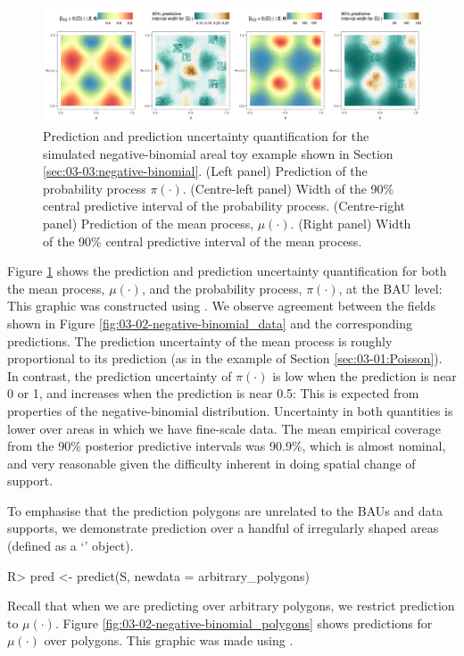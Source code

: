 \documentclass[article]{jss}
\newcommand{\class}[1]{`\code{#1}'}
\newcommand{\fct}[1]{\code{#1()}}
\begin{document}
\begin{figure}[t!]
    \centering
    \includegraphics[width = \linewidth]{img/Negbinom_sim_BAU_predictions.png}
    \caption{Prediction and prediction uncertainty quantification for the simulated negative-binomial areal toy example shown in Section \ref{sec:03-03:negative-binomial}. (Left panel) Prediction of the probability process $\pi(\cdot)$. (Centre-left panel) Width of the 90\% central predictive interval of the probability process. (Centre-right panel) Prediction of the mean process, $\mu(\cdot)$. (Right panel) Width of the 90\% central predictive interval of the mean process.
}   
  \label{fig:03-02-negative-binomial}
\end{figure}

Figure \ref{fig:03-02-negative-binomial} shows the prediction and prediction uncertainty quantification for both the mean process, $\mu(\cdot)$, and the probability process, $\pi(\cdot)$, at the BAU level: This graphic was constructed using \fct{plot}.
We observe agreement between the fields shown in Figure \ref{fig:03-02-negative-binomial_data} and the corresponding predictions.  
The prediction uncertainty of the mean process is roughly proportional to its prediction (as in the example of Section \ref{sec:03-01:Poisson}). 
In contrast, the prediction uncertainty of $\pi(\cdot)$ is low when the prediction is near 0 or 1, and increases when the prediction is near 0.5: This is expected from properties of the negative-binomial distribution. 
 Uncertainty in both quantities is lower over areas in which we have fine-scale data. 
 The mean empirical coverage from the 90\% posterior predictive intervals was 90.9\%, which is almost nominal, and very reasonable given the difficulty inherent in doing spatial change of support.

To emphasise that the prediction polygons are unrelated to the BAUs and data supports, we demonstrate prediction over a handful of irregularly shaped areas (defined as a \class{SpatialPolygons*} object).  
\begin{Code}
R> pred <- predict(S, newdata = arbitrary_polygons)
\end{Code}
Recall that when we are predicting over arbitrary polygons, we restrict prediction to $\mu(\cdot)$.
Figure \ref{fig:03-02-negative-binomial_polygons} shows predictions 
for $\mu(\cdot)$ over polygons. This graphic was made using \fct{plot}.
\end{document}
